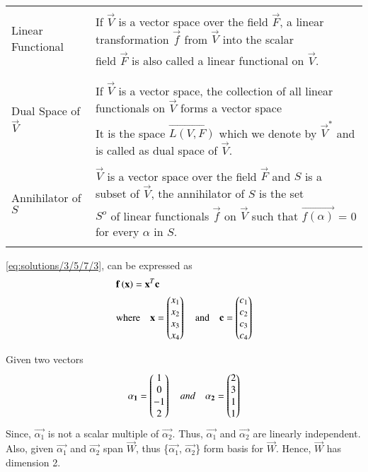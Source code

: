 \begin{table}[!ht]
	\begin{tabular}{|l|l|}
		\hline
		\multirow{3}{*}{Linear Functional} & \\
		& If $\vec{V}$ is a vector space over the field $\vec{F}$, a linear transformation $\vec{f}$ from $\vec{V}$
		into the scalar \\
		& field $\vec{F}$ is also called a linear functional on $\vec{V}$. \\
		& \\
		\hline
		\multirow{3}{*}{Dual Space of $\vec{V}$} & \\
		& If $\vec{V}$ is a vector space, the collection of all linear functionals on $\vec{V}$ forms a vector space\\
		& It is the space $\vec{L(V, F)}$ which we denote by $\vec{V}^{*}$ and is called as dual space of $\vec{V}$.\\
		\hline
		\multirow{3}{*}{Annihilator of $S$} & \\
		& $\vec{V}$ is a vector space over the field $\vec{F}$ and $S$ is a subset of $\vec{V}$, the annihilator of $S$ is the set \\
		& $S^{o}$ of linear functionals $\vec{f}$ on $\vec{V}$ such that $\vec{f(\alpha)}$ = 0 for every $\alpha$ in $S$. \\
		& \\
		\hline
	\end{tabular}
\end{table}
\eqref{eq:solutions/3/5/7/3}, can be expressed as
\begin{align}
& \mathbf{f}\left(\mathbf{x}\right) = \mathbf{x}^T\mathbf{c} \label{eq:solutions/3/5/7/5} \\
& \text{where} \quad \mathbf{x} = \begin{pmatrix}x_1 \\ x_2 \\ x_3 \\ x_4\end{pmatrix} \quad \text{and} \quad \mathbf{c} = \begin{pmatrix}c_1 \\ c_2 \\ c_3 \\ c_4\end{pmatrix}
\end{align}
 
Given two vectors 
\begin{align}
\mathbf{\alpha_1} = \begin{pmatrix}1 \\ 0 \\ -1 \\ 2\end{pmatrix} \quad and \quad \mathbf{\alpha_2} = \begin{pmatrix}2 \\ 3 \\ 1 \\ 1\end{pmatrix}
\end{align}
Since, $\vec{\alpha_1}$ is not a scalar multiple of $\vec{\alpha_2}$. Thus, $\vec{\alpha_1}$ and $\vec{\alpha_2}$ are linearly independent. Also, given $\vec{\alpha_1}$ and $\vec{\alpha_2}$ span $\vec{W}$, thus \{$\vec{\alpha_1}$, $\vec{\alpha_2}$\} form basis for $\vec{W}$. Hence, $\vec{W}$ has dimension 2.

